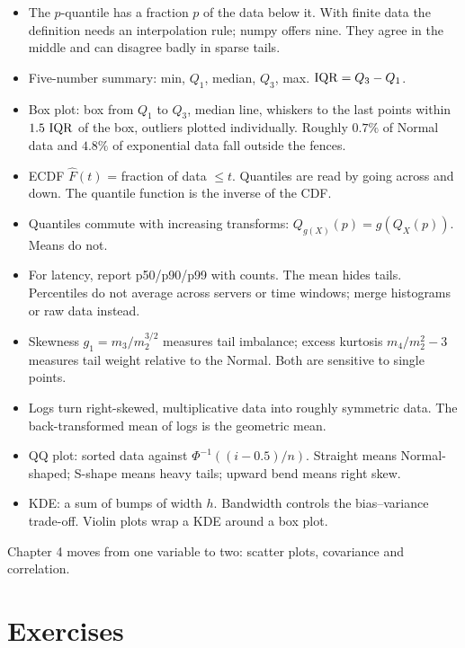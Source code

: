 \begin{itemize}
  \item The $p$-quantile has a fraction $p$ of the data below it. With finite data the
  definition needs an interpolation rule; numpy offers nine. They agree in the middle and
  can disagree badly in sparse tails.
  \item Five-number summary: min, $Q_1$, median, $Q_3$, max. $\operatorname{IQR} = Q_3 - Q_1$.
  \item Box plot: box from $Q_1$ to $Q_3$, median line, whiskers to the last points within
  $1.5\,\operatorname{IQR}$ of the box, outliers plotted individually. Roughly $0.7\%$ of Normal data and
  $4.8\%$ of exponential data fall outside the fences.
  \item ECDF $\hat F(t)$ = fraction of data $\le t$. Quantiles are read by going across
  and down. The quantile function is the inverse of the CDF.
  \item Quantiles commute with increasing transforms: $Q_{g(X)}(p) = g(Q_X(p))$. Means do not.
  \item For latency, report p50/p90/p99 with counts. The mean hides tails. Percentiles do
  not average across servers or time windows; merge histograms or raw data instead.
  \item Skewness $g_1 = m_3/m_2^{3/2}$ measures tail imbalance; excess kurtosis
  $m_4/m_2^2 - 3$ measures tail weight relative to the Normal. Both are sensitive to single
  points.
  \item Logs turn right-skewed, multiplicative data into roughly symmetric data. The
  back-transformed mean of logs is the geometric mean.
  \item QQ plot: sorted data against $\Phi^{-1}((i-0.5)/n)$. Straight means Normal-shaped;
  S-shape means heavy tails; upward bend means right skew.
  \item KDE: a sum of bumps of width $h$. Bandwidth controls the bias--variance trade-off.
  Violin plots wrap a KDE around a box plot.
\end{itemize}

Chapter 4 moves from one variable to two: scatter plots, covariance and correlation.

\section{Exercises}

